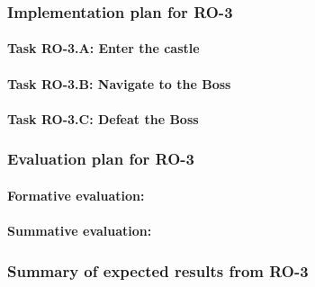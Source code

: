 \vspace{-10pt}
\subsubsection{Implementation plan for RO-3} 

\vspace{-6pt}
\paragraph*{Task RO-3.A: Enter the castle}
\lipsum[1]

\vspace{-6pt}
\paragraph*{Task RO-3.B: Navigate to the Boss}
\lipsum[1]

\vspace{-6pt}
\paragraph*{Task RO-3.C: Defeat the Boss}
\lipsum[1]

\vspace{-10pt}
\subsubsection{Evaluation plan for RO-3}

\vspace{-8pt}
\paragraph*{Formative evaluation:}  
\lipsum[1]

\vspace{-14pt}
\paragraph*{Summative evaluation:} 
\lipsum[1]


\vspace{-10pt}
\subsubsection{Summary of expected results from RO-3}
\vspace{-6pt}

\lipsum[1]


\renewcommand{\thesubsection}{\arabic{section}.\arabic{subsection}}


